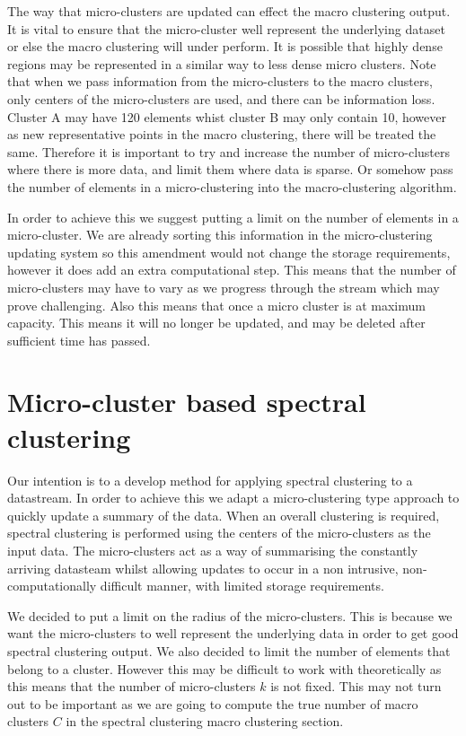 \documentclass[a4document]{article}		%
\begin{document}
The way that micro-clusters are updated can effect the macro clustering output. It is vital to ensure that the micro-cluster well represent the underlying dataset or else the macro clustering will under perform. It is possible that highly dense regions may be represented in a similar way to less dense micro clusters. Note that when we pass information from the micro-clusters to the macro clusters, only centers of the micro-clusters are used, and there can be information loss. Cluster A may have 120 elements whist cluster B may only contain 10, however as new representative points in the macro clustering, there will be treated the same. Therefore it is important to try and increase the number of micro-clusters where there is more data, and limit them where data is sparse. Or somehow pass the number of elements in a micro-clustering into the macro-clustering algorithm. 

In order to achieve this we suggest putting a limit on the number of elements in a micro-cluster. We are already sorting this information in the micro-clustering updating system so this amendment would not change the storage requirements, however it does add an extra computational step. This means that the number of micro-clusters may have to vary as we progress through the stream which may prove challenging. Also this means that once a micro cluster is at maximum capacity. This means it will no longer be updated, and may be deleted after sufficient time has passed. 

\section{Micro-cluster based spectral clustering}
\label{sec:microSpec}

Our intention is to a develop method for applying spectral clustering to a datastream. In order to achieve this we adapt a micro-clustering type approach to quickly update a summary of the data. When an overall clustering is required, spectral clustering is performed using the centers of the micro-clusters as the input data. The micro-clusters act as a way of summarising the constantly arriving datasteam whilst allowing updates to occur in a non intrusive, non-computationally difficult manner, with limited storage requirements. 

We decided to put a limit on the radius of the micro-clusters. This is because we want the micro-clusters to well represent the underlying data in order to get good spectral clustering output. We also decided to limit the number of elements that belong to a cluster. However this may be difficult to work with theoretically as this means that the number of micro-clusters $k$ is not fixed. This may not turn out to be important as we are going to compute the true number of macro clusters $C$ in the spectral clustering macro clustering section. 
\end{document}
